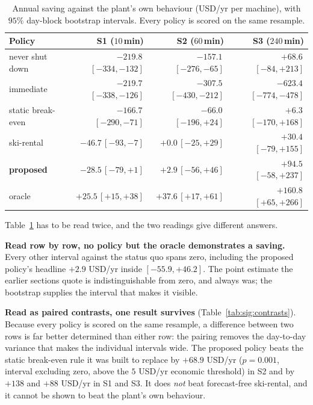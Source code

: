 \begin{table}[t]
\centering
\caption{Annual saving against the plant's own behaviour (USD/yr per
machine), with $95\%$ day-block bootstrap intervals. Every policy is
scored on the same resample.}
\label{tab:sig:decision}
\small
\setlength{\tabcolsep}{3pt}
\begin{tabular}{@{}lrrr@{}}
\toprule
Policy & S1 ($10$\,min) & S2 ($60$\,min) & S3 ($240$\,min) \\
\midrule
never shut down   & $-219.8$\,{\footnotesize$[-334,-132]$} & $-157.1$\,{\footnotesize$[-276,-65]$} & $+68.6$\,{\footnotesize$[-84,+213]$} \\
immediate         & $-219.7$\,{\footnotesize$[-338,-126]$} & $-307.5$\,{\footnotesize$[-430,-212]$} & $-623.4$\,{\footnotesize$[-774,-478]$} \\
static break-even & $-166.7$\,{\footnotesize$[-290,-71]$}  & $-66.0$\,{\footnotesize$[-196,+24]$}  & $+6.3$\,{\footnotesize$[-170,+168]$} \\
ski-rental        & $-46.7$\,{\footnotesize$[-93,-7]$}     & $+0.0$\,{\footnotesize$[-25,+29]$}    & $+30.4$\,{\footnotesize$[-79,+155]$} \\
\textbf{proposed} & $\mathbf{-28.5}$\,{\footnotesize$[-79,+1]$} & $\mathbf{+2.9}$\,{\footnotesize$[-56,+46]$} & $\mathbf{+94.5}$\,{\footnotesize$[-58,+237]$} \\
oracle            & $+25.5$\,{\footnotesize$[+15,+38]$}    & $+37.6$\,{\footnotesize$[+17,+61]$}   & $+160.8$\,{\footnotesize$[+65,+266]$} \\
\bottomrule
\end{tabular}
\end{table}

Table~\ref{tab:sig:decision} has to be read twice, and the two readings
give different answers.

\textbf{Read row by row, no policy but the oracle demonstrates a
saving.} Every other interval against the status quo spans zero,
including the proposed policy's headline $+2.9$ USD/yr inside
$[-55.9,+46.2]$. The point estimate the earlier sections quote is
indistinguishable from zero, and always was; the bootstrap supplies the
interval that makes it visible.

\textbf{Read as paired contrasts, one result survives}
(Table~\ref{tab:sig:contrasts}). Because every policy is scored on the
same resample, a difference between two rows is far better determined
than either row: the pairing removes the day-to-day variance that makes
the individual intervals wide. The proposed policy beats the static
break-even rule it was built to replace by $+68.9$ USD/yr
($p=0.001$, interval excluding zero, above the $5$ USD/yr economic
threshold) in S2 and by $+138$ and $+88$ USD/yr in S1 and S3. It does
\emph{not} beat forecast-free ski-rental, and it cannot be shown to beat
the plant's own behaviour.

